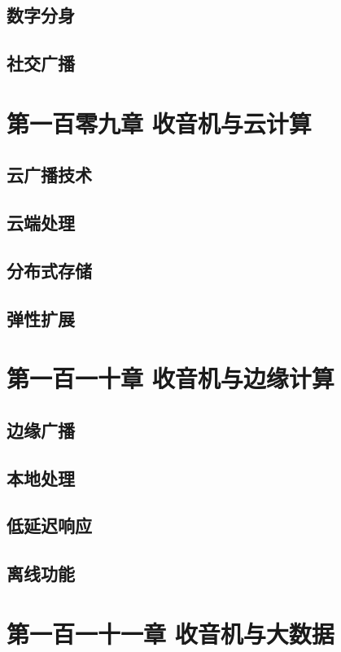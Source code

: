 \documentclass[12pt,UTF8]{ctexbook}
\begin{document}
\section{数字分身}
\section{社交广播}

\chapter{第一百零九章 收音机与云计算}

\section{云广播技术}
\section{云端处理}
\section{分布式存储}
\section{弹性扩展}

\chapter{第一百一十章 收音机与边缘计算}

\section{边缘广播}
\section{本地处理}
\section{低延迟响应}
\section{离线功能}

\chapter{第一百一十一章 收音机与大数据}
\end{document}
